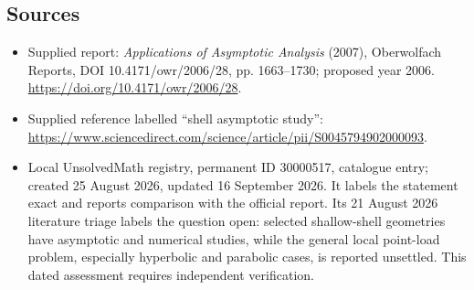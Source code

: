\documentclass[11pt]{article}
\begin{document}
\subsection{Sources}
\begin{itemize}
\item Supplied report: \emph{Applications of Asymptotic Analysis} (2007), Oberwolfach Reports, DOI 10.4171/owr/2006/28, pp. 1663--1730; proposed year 2006. \url{https://doi.org/10.4171/owr/2006/28}.
\item Supplied reference labelled ``shell asymptotic study'': \url{https://www.sciencedirect.com/science/article/pii/S0045794902000093}.
\item Local UnsolvedMath registry, permanent ID 30000517, catalogue entry; created 25 August 2026, updated 16 September 2026. It labels the statement exact and reports comparison with the official report. Its 21 August 2026 literature triage labels the question open: selected shallow-shell geometries have asymptotic and numerical studies, while the general local point-load problem, especially hyperbolic and parabolic cases, is reported unsettled. This dated assessment requires independent verification.
\end{itemize}
\end{document}
